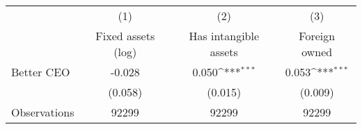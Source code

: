 {
\def\sym#1{\ifmmode^{#1}\else\(^{#1}\)\fi}
\begin{tabular}{l*{3}{c}}
\hline\hline
                    &\multicolumn{1}{c}{(1)}&\multicolumn{1}{c}{(2)}&\multicolumn{1}{c}{(3)}\\
                    &\multicolumn{1}{c}{Fixed assets (log)}&\multicolumn{1}{c}{Has intangible assets}&\multicolumn{1}{c}{Foreign owned}\\
\hline
Better CEO          &      -0.028         &       0.050\sym{***}&       0.053\sym{***}\\
                    &     (0.058)         &     (0.015)         &     (0.009)         \\
\hline
Observations        &       92299         &       92299         &       92299         \\
\hline\hline
\end{tabular}
}
